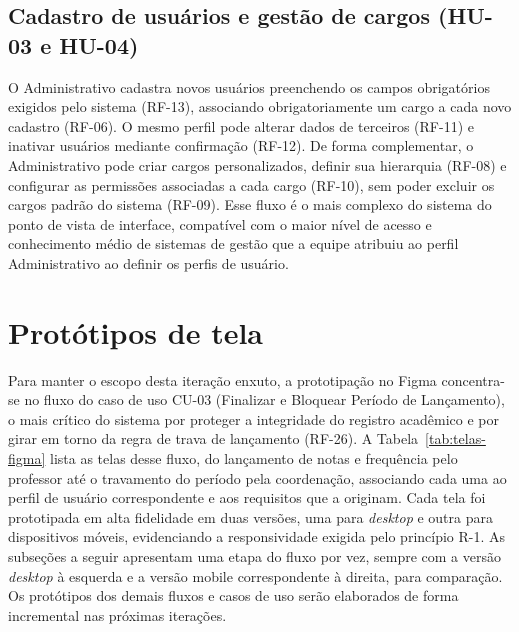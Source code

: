 \subsection{Cadastro de usuários e gestão de cargos (HU-03 e HU-04)}

O Administrativo cadastra novos usuários preenchendo os campos obrigatórios
exigidos pelo sistema (RF-13), associando obrigatoriamente um cargo a cada
novo cadastro (RF-06). O mesmo perfil pode alterar dados de terceiros
(RF-11) e inativar usuários mediante confirmação (RF-12). De forma
complementar, o Administrativo pode criar cargos personalizados, definir sua
hierarquia (RF-08) e configurar as permissões associadas a cada cargo
(RF-10), sem poder excluir os cargos padrão do sistema (RF-09). Esse fluxo é
o mais complexo do sistema do ponto de vista de interface, compatível com o
maior nível de acesso e conhecimento médio de sistemas de gestão que a
equipe atribuiu ao perfil Administrativo ao definir os perfis de usuário.

\section{Protótipos de tela}

Para manter o escopo desta iteração enxuto, a prototipação no Figma
concentra-se no fluxo do caso de uso CU-03 (Finalizar e Bloquear Período de
Lançamento), o mais crítico do sistema por proteger a integridade do registro
acadêmico e por girar em torno da regra de trava de lançamento (RF-26). A
Tabela~\ref{tab:telas-figma} lista as telas desse fluxo, do lançamento de notas
e frequência pelo professor até o travamento do período pela coordenação,
associando cada uma ao perfil de usuário correspondente e aos requisitos que a
originam. Cada tela foi prototipada em alta fidelidade em duas versões, uma para
\textit{desktop} e outra para dispositivos móveis, evidenciando a
responsividade exigida pelo princípio R-1. As subseções a seguir apresentam uma
etapa do fluxo por vez, sempre com a versão \textit{desktop} à esquerda e a
versão mobile correspondente à direita, para comparação. Os protótipos dos
demais fluxos e casos de uso serão elaborados de forma incremental nas próximas
iterações.

